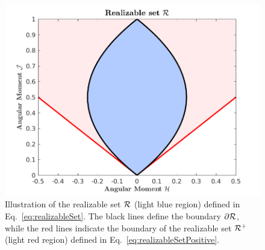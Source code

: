\begin{figure}[H]
  \centering
  \includegraphics[width=1.0\linewidth]{figures/RealizableSetFermionic}
  \caption{Illustration of the realizable set $\mathcal{R}$ (light blue region) defined in Eq.~\eqref{eq:realizableSet}.  
  The black lines define the boundary $\partial\mathcal{R}$, while the red lines indicate the boundary of the realizable set $\mathcal{R}^{+}$ (light red region) defined in Eq.~\eqref{eq:realizableSetPositive}.}
  \label{fig:RealizableSetFermionic}
\end{figure}


